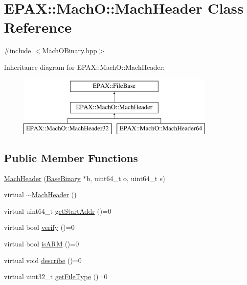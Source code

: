 \hypertarget{class_e_p_a_x_1_1_mach_o_1_1_mach_header}{\section{\-E\-P\-A\-X\-:\-:\-Mach\-O\-:\-:\-Mach\-Header \-Class \-Reference}
\label{class_e_p_a_x_1_1_mach_o_1_1_mach_header}
}


{\ttfamily \#include $<$\-Mach\-O\-Binary.\-hpp$>$}

\-Inheritance diagram for \-E\-P\-A\-X\-:\-:\-Mach\-O\-:\-:\-Mach\-Header\-:\begin{figure}[H]
\begin{center}
\leavevmode
\includegraphics[height=3.000000cm]{class_e_p_a_x_1_1_mach_o_1_1_mach_header}
\end{center}
\end{figure}
\subsection*{\-Public \-Member \-Functions}
\begin{DoxyCompactItemize}
\item 
\hyperlink{class_e_p_a_x_1_1_mach_o_1_1_mach_header_a75491057ad159d2eb3f3a183ac7eecc9}{\-Mach\-Header} (\hyperlink{class_e_p_a_x_1_1_base_binary}{\-Base\-Binary} $\ast$b, uint64\-\_\-t o, uint64\-\_\-t s)
\item 
virtual \hyperlink{class_e_p_a_x_1_1_mach_o_1_1_mach_header_ae5338ee30e88a688edce08ec66094fa8}{$\sim$\-Mach\-Header} ()
\item 
virtual uint64\-\_\-t \hyperlink{class_e_p_a_x_1_1_mach_o_1_1_mach_header_aeae22d677b30ceeed55c7f7910a45ff1}{get\-Start\-Addr} ()=0
\item 
virtual bool \hyperlink{class_e_p_a_x_1_1_mach_o_1_1_mach_header_aeca0eb4432fece14fc5bb27810a63e06}{verify} ()=0
\item 
virtual bool \hyperlink{class_e_p_a_x_1_1_mach_o_1_1_mach_header_a95466e1612d0ad48d991830f4c3898ee}{is\-A\-R\-M} ()=0
\item 
virtual void \hyperlink{class_e_p_a_x_1_1_mach_o_1_1_mach_header_a6e04356c40b005cc7f9c8e318f327e2c}{describe} ()=0
\item 
virtual uint32\-\_\-t \hyperlink{class_e_p_a_x_1_1_mach_o_1_1_mach_header_a667362bbcc5a18b89b430c3bbf9dbcf3}{get\-File\-Type} ()=0
\end{DoxyCompactItemize}
